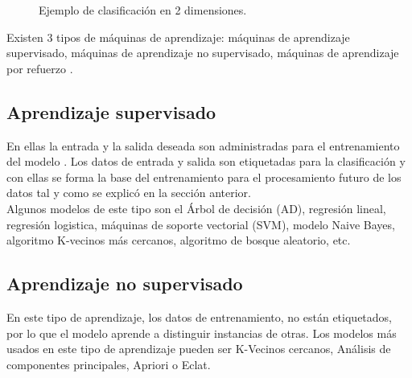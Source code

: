 \documentclass[twoside,spanish,ESP,MSc]{plantillaLabUPV}
\theoremstyle{definition}
\begin{document}
\begin{figure}  
\centering
{}
\caption{Ejemplo de clasificación en 2 dimensiones.}
\label{fig:clplot}  
\end{figure}



Existen 3 tipos de máquinas de aprendizaje: máquinas de aprendizaje supervisado, máquinas de aprendizaje no supervisado, máquinas de aprendizaje por refuerzo \cite{supervisadobook}.


\subsection{Aprendizaje supervisado}

En ellas la entrada y la salida deseada son administradas para el entrenamiento del modelo  \cite{classifs}. Los datos de entrada y salida son etiquetadas para la clasificación y con ellas se forma la base del entrenamiento para el procesamiento futuro de los datos tal y como se explicó en la sección anterior.\\

Algunos modelos de este tipo son el Árbol de decisión (AD), regresión lineal, regresión logistica, máquinas de soporte vectorial (SVM), modelo Naive Bayes, algoritmo K-vecinos más cercanos, algoritmo de bosque aleatorio, etc.


\subsection{Aprendizaje no supervisado}

En este tipo de aprendizaje, los datos de entrenamiento, no están etiquetados, por lo que el modelo aprende a distinguir instancias de otras. Los modelos más usados en este tipo de aprendizaje pueden ser K-Vecinos cercanos, Análisis de componentes principales, Apriori o Eclat.
\end{document}
